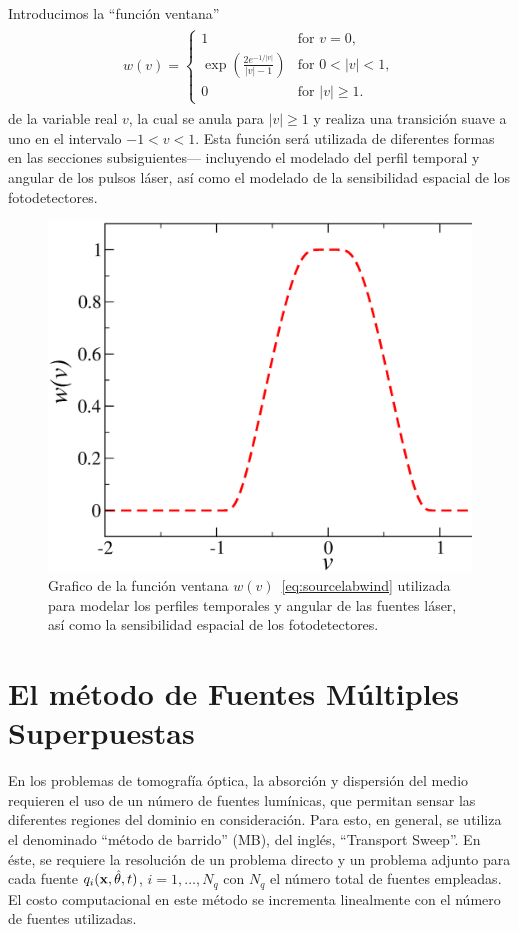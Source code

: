 Introducimos la ``función ventana''~\cite{Bruno2014}
\begin{equation}
\begin{aligned}
\begin{split}
w(v)=
\begin{cases}
  1 &\text{for} \, \, v = 0, \\
       \exp{\left(\frac{2e^{-1/|v|}}{|v|-1}\right)} & \text{for} \, \, 0 < |v| < 1, \\
       0 &\text{for} \, \, |v| \geq 1.
     \end{cases}
\end{split}
\end{aligned}
\label{eq:sourcelabwind}
\end{equation}
de la variable real $v$, la cual se anula para $|v|\geq 1$ y realiza 
una transición suave a uno en el intervalo $-1 < v < 1$. Esta función 
será utilizada de diferentes formas en las secciones subsiguientes---
incluyendo el modelado del perfil temporal y angular de los pulsos láser, 
así como el modelado de la sensibilidad espacial de los fotodetectores.
\begin{figure}[h!]
\centering
  \includegraphics[width=0.5\linewidth]{figuras/windowed.eps}
  \caption{Grafico de la función ventana $w(v)$~\eqref{eq:sourcelabwind} utilizada 
  para modelar los perfiles temporales y angular de las fuentes láser, 
  así como la sensibilidad espacial de los fotodetectores.}
 \label{fig:window}
\end{figure}


\section{El método de Fuentes Múltiples Superpuestas}
\label{sec:FMS}
En los problemas de tomografía óptica, la absorción 
y dispersión del medio requieren el uso de un número 
de fuentes lumínicas, que permitan sensar 
las diferentes regiones del dominio en consideración. 
Para esto, en general, se utiliza el denominado ``método de barrido'' (MB), del inglés, ``Transport Sweep''.
En éste, se requiere la resolución de un problema directo y un problema adjunto 
para cada fuente $q_i(\mathbf{x},\hat{\theta},t)$, $i=1,\ldots,N_q$ 
con $N_q$ el número total de fuentes empleadas. 
El costo computacional en este método se 
incrementa linealmente con el número de fuentes utilizadas. 

